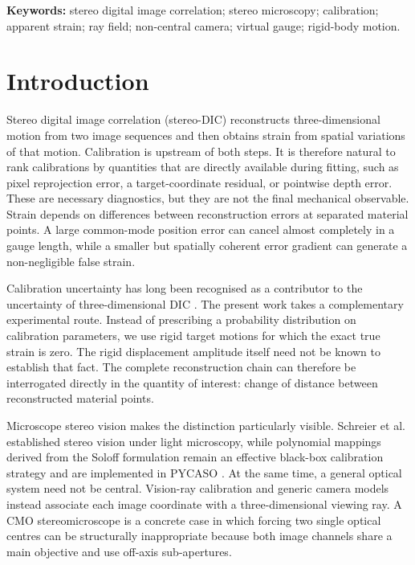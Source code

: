 \documentclass[11pt]{article}
\begin{document}
\textbf{Keywords:} stereo digital image correlation; stereo microscopy; calibration; apparent strain; ray field; non-central camera; virtual gauge; rigid-body motion.

\section{Introduction}
Stereo digital image correlation (stereo-DIC) reconstructs three-dimensional motion from two image sequences and then obtains strain from spatial variations of that motion. Calibration is upstream of both steps. It is therefore natural to rank calibrations by quantities that are directly available during fitting, such as pixel reprojection error, a target-coordinate residual, or pointwise depth error. These are necessary diagnostics, but they are not the final mechanical observable. Strain depends on differences between reconstruction errors at separated material points. A large common-mode position error can cancel almost completely in a gauge length, while a smaller but spatially coherent error gradient can generate a non-negligible false strain.

Calibration uncertainty has long been recognised as a contributor to the uncertainty of three-dimensional DIC \cite{reu2013}. The present work takes a complementary experimental route. Instead of prescribing a probability distribution on calibration parameters, we use rigid target motions for which the exact true strain is zero. The rigid displacement amplitude itself need not be known to establish that fact. The complete reconstruction chain can therefore be interrogated directly in the quantity of interest: change of distance between reconstructed material points.

Microscope stereo vision makes the distinction particularly visible. Schreier et al. \cite{schreier2004} established stereo vision under light microscopy, while polynomial mappings derived from the Soloff formulation \cite{soloff1997} remain an effective black-box calibration strategy and are implemented in PYCASO \cite{pycaso2023}. At the same time, a general optical system need not be central. Vision-ray calibration \cite{bothe2010} and generic camera models \cite{schops2020} instead associate each image coordinate with a three-dimensional viewing ray. A CMO stereomicroscope is a concrete case in which forcing two single optical centres can be structurally inappropriate because both image channels share a main objective and use off-axis sub-apertures.
\end{document}
